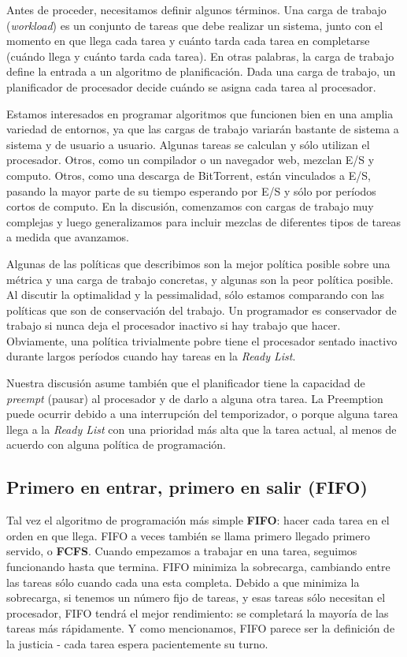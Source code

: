 \documentclass[10pt]{book}
\begin{document}
Antes de proceder, necesitamos definir algunos términos. Una carga de trabajo (\textit{workload}) es un conjunto de tareas que debe realizar un sistema, junto con el momento en que llega cada tarea y cuánto tarda cada tarea en completarse (cuándo llega y cuánto tarda cada tarea). En otras palabras, la carga de trabajo define la entrada a un algoritmo de planificación. Dada una carga de trabajo, un planificador de procesador decide cuándo se asigna cada tarea al procesador.

Estamos interesados en programar algoritmos que funcionen bien en una amplia variedad de entornos, ya que las cargas de trabajo variarán bastante de sistema a sistema y de usuario a usuario. Algunas tareas se calculan y sólo utilizan el procesador. Otros, como un compilador o un navegador web, mezclan E/S y computo. Otros, como una descarga de BitTorrent, están vinculados a E/S, pasando la mayor parte de su tiempo esperando por E/S y sólo por períodos cortos de computo. En la discusión, comenzamos con cargas de trabajo muy complejas y luego generalizamos para incluir mezclas de diferentes tipos de tareas a medida que avanzamos.

Algunas de las políticas que describimos son la mejor política posible sobre una métrica y una carga de trabajo concretas, y algunas son la peor política posible. Al discutir la optimalidad y la pessimalidad, sólo estamos comparando con las políticas que son de conservación del trabajo. Un programador es conservador de trabajo si nunca deja el procesador inactivo si hay trabajo que hacer. Obviamente, una política trivialmente pobre tiene el procesador sentado inactivo durante largos períodos cuando hay tareas en la \textit{Ready List}.

Nuestra discusión asume también que el planificador tiene la capacidad de \textit{preempt} (pausar) al procesador y de darlo a alguna otra tarea. La Preemption puede ocurrir debido a una interrupción del temporizador, o porque alguna tarea llega a la \textit{Ready List} con una prioridad más alta que la tarea actual, al menos de acuerdo con alguna política de programación.

\subsection{Primero en entrar, primero en salir (FIFO)}
Tal vez el algoritmo de programación más simple \textbf{FIFO}: hacer cada tarea en el orden en que llega. FIFO a veces también se llama primero llegado primero servido, o \textbf{FCFS}. Cuando empezamos a trabajar en una tarea, seguimos funcionando hasta que termina. FIFO minimiza la sobrecarga, cambiando entre las tareas sólo cuando cada una esta completa. Debido a que minimiza la sobrecarga, si tenemos un número fijo de tareas, y esas tareas sólo necesitan el procesador, FIFO tendrá el mejor rendimiento: se completará la mayoría de las tareas más rápidamente. Y como mencionamos, FIFO parece ser la definición de la justicia - cada tarea espera pacientemente su turno.
\end{document}
